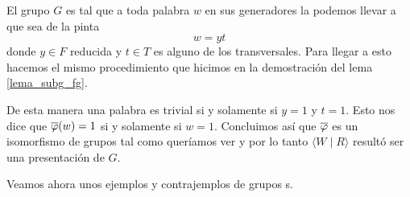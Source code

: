 \documentclass[tesis.tex]{subfiles}
\begin{document}
\begin{obs}
	El grupo  $G$ es tal que a toda palabra $w$ en sus generadores la podemos llevar a que sea de la pinta
	\[
	w = yt
	\]
	donde $y \in F$ reducida y $t \in T$ es alguno de los transversales. 
	Para llegar a esto hacemos el mismo procedimiento que hicimos en la demostración del lema \ref{lema_subg_fg}.
	
	De esta manera una palabra es trivial si y solamente si $y=1$ y $t=1$. 
	Esto nos dice que $\overline \varphi(w) = 1$ si y solamente si $w=1$. 
	Concluimos así que $\overline \varphi$ es un isomorfismo de grupos tal como queríamos ver y por lo tanto  $\langle W \mid R \rangle$ resultó ser una presentación de $G$.
	
\end{obs}
\medskip

Veamos ahora unos ejemplos y contrajemplos de grupos \vl s.
\end{document}
